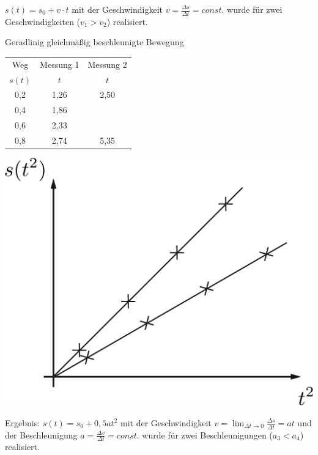 $s(t) = s_0 + v \cdot t$ mit der Geschwindigkeit $v = \frac{\Delta s}{\Delta t} = const.$ wurde für zwei Geschwindigkeiten ($v_1 > v_2$) realisiert.

 Geradlinig gleichmäßig beschleunigte Bewegung

\begin{minipage}{.5\textwidth}
	\begin{tabular}{| c | c | c |}
		\hline
		Weg & Messung 1 & Messung 2\\
		$s(t)$ & $t$ & $t$ \\
		\hline
		0,2 & 1,26 & 2,50 \\
		0,4 & 1,86 & \\
		0,6 & 2,33 & \\
		0,8 & 2,74 & 5,35 \\
		\hline
	\end{tabular}
\end{minipage} \hfill
\begin{minipage}{.5\textwidth}
	\includegraphics[width=.8\textwidth]{img/1_4}
\end{minipage}

Ergebnis: $s(t) = s_0 + 0,5at^2$ mit der Geschwindigkeit $v = \lim_{\Delta t \to 0} \frac{\Delta s}{\Delta t} = at$ und der Beschleunigung $a = \frac{\Delta v}{\Delta t} = const.$ wurde für zwei Beschleunigungen ($a_3 < a_4$) realisiert.
